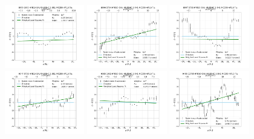 \begin{figure}
    \includegraphics[width=0.31\textwidth]{Images/WLSFITS/CPSB/8979-1902.png}
    \includegraphics[width=0.31\textwidth]{Images/WLSFITS/CPSB/8996-3704.png}
    \includegraphics[width=0.31\textwidth]{Images/WLSFITS/CPSB/8997-3703.png}
    \includegraphics[width=0.31\textwidth]{Images/WLSFITS/CPSB/9047-3701.png}
    \includegraphics[width=0.31\textwidth]{Images/WLSFITS/CPSB/9085-1902.png}
    \includegraphics[width=0.31\textwidth]{Images/WLSFITS/CPSB/9493-12705.png}

\end{figure}
